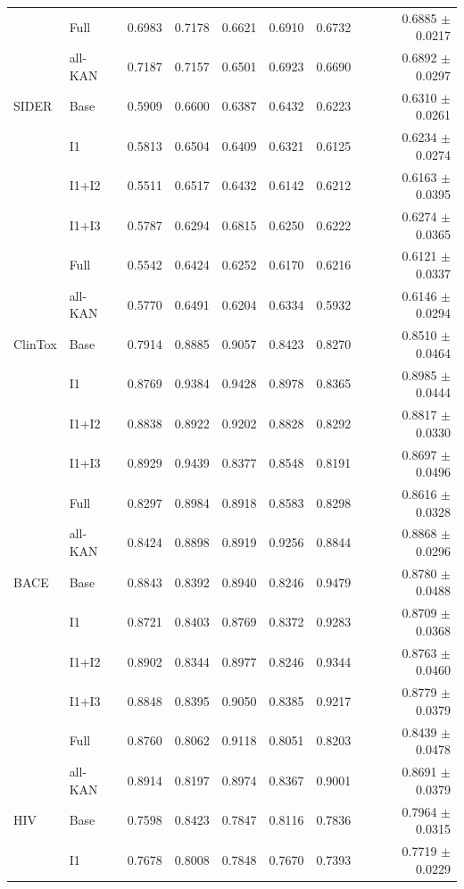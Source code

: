 \documentclass[journal=jcisd8,manuscript=article]{achemso}
\begin{document}
\begin{landscape}
\begin{longtable}{llrrrrrr}
 & Full & 0.6983 & 0.7178 & 0.6621 & 0.6910 & 0.6732 & 0.6885 $\pm$ 0.0217 \\
 & all-KAN & 0.7187 & 0.7157 & 0.6501 & 0.6923 & 0.6690 & 0.6892 $\pm$ 0.0297 \\
\midrule
SIDER & Base & 0.5909 & 0.6600 & 0.6387 & 0.6432 & 0.6223 & 0.6310 $\pm$ 0.0261 \\
 & I1 & 0.5813 & 0.6504 & 0.6409 & 0.6321 & 0.6125 & 0.6234 $\pm$ 0.0274 \\
 & I1+I2 & 0.5511 & 0.6517 & 0.6432 & 0.6142 & 0.6212 & 0.6163 $\pm$ 0.0395 \\
 & I1+I3 & 0.5787 & 0.6294 & 0.6815 & 0.6250 & 0.6222 & 0.6274 $\pm$ 0.0365 \\
 & Full & 0.5542 & 0.6424 & 0.6252 & 0.6170 & 0.6216 & 0.6121 $\pm$ 0.0337 \\
 & all-KAN & 0.5770 & 0.6491 & 0.6204 & 0.6334 & 0.5932 & 0.6146 $\pm$ 0.0294 \\
\midrule
ClinTox & Base & 0.7914 & 0.8885 & 0.9057 & 0.8423 & 0.8270 & 0.8510 $\pm$ 0.0464 \\
 & I1 & 0.8769 & 0.9384 & 0.9428 & 0.8978 & 0.8365 & 0.8985 $\pm$ 0.0444 \\
 & I1+I2 & 0.8838 & 0.8922 & 0.9202 & 0.8828 & 0.8292 & 0.8817 $\pm$ 0.0330 \\
 & I1+I3 & 0.8929 & 0.9439 & 0.8377 & 0.8548 & 0.8191 & 0.8697 $\pm$ 0.0496 \\
 & Full & 0.8297 & 0.8984 & 0.8918 & 0.8583 & 0.8298 & 0.8616 $\pm$ 0.0328 \\
 & all-KAN & 0.8424 & 0.8898 & 0.8919 & 0.9256 & 0.8844 & 0.8868 $\pm$ 0.0296 \\
\midrule
BACE & Base & 0.8843 & 0.8392 & 0.8940 & 0.8246 & 0.9479 & 0.8780 $\pm$ 0.0488 \\
 & I1 & 0.8721 & 0.8403 & 0.8769 & 0.8372 & 0.9283 & 0.8709 $\pm$ 0.0368 \\
 & I1+I2 & 0.8902 & 0.8344 & 0.8977 & 0.8246 & 0.9344 & 0.8763 $\pm$ 0.0460 \\
 & I1+I3 & 0.8848 & 0.8395 & 0.9050 & 0.8385 & 0.9217 & 0.8779 $\pm$ 0.0379 \\
 & Full & 0.8760 & 0.8062 & 0.9118 & 0.8051 & 0.8203 & 0.8439 $\pm$ 0.0478 \\
 & all-KAN & 0.8914 & 0.8197 & 0.8974 & 0.8367 & 0.9001 & 0.8691 $\pm$ 0.0379 \\
\midrule
HIV & Base & 0.7598 & 0.8423 & 0.7847 & 0.8116 & 0.7836 & 0.7964 $\pm$ 0.0315 \\
 & I1 & 0.7678 & 0.8008 & 0.7848 & 0.7670 & 0.7393 & 0.7719 $\pm$ 0.0229 \\

\end{longtable}
\end{landscape}
\end{document}
